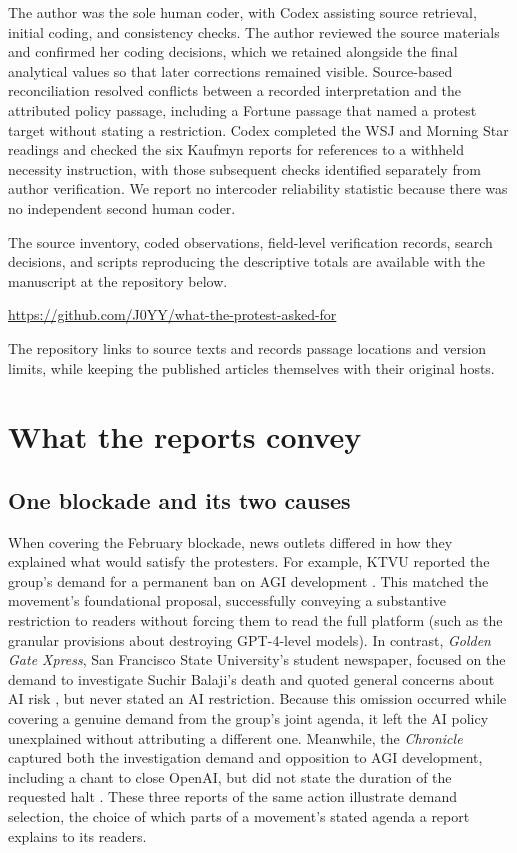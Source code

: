 \documentclass[11pt]{article}
\begin{document}
The author was the sole human coder, with Codex assisting source retrieval, initial coding, and consistency checks. The author reviewed the source materials and confirmed her coding decisions, which we retained alongside the final analytical values so that later corrections remained visible. Source-based reconciliation resolved conflicts between a recorded interpretation and the attributed policy passage, including a Fortune passage that named a protest target without stating a restriction. Codex completed the WSJ and Morning Star readings and checked the six Kaufmyn reports for references to a withheld necessity instruction, with those subsequent checks identified separately from author verification. We report no intercoder reliability statistic because there was no independent second human coder.

The source inventory, coded observations, field-level verification records, search decisions, and scripts reproducing the descriptive totals are available with the manuscript at the repository below.
\begin{center}
\url{https://github.com/J0YY/what-the-protest-asked-for}
\end{center}
\noindent The repository links to source texts and records passage locations and version limits, while keeping the published articles themselves with their original hosts.

\section{What the reports convey}
\subsection{One blockade and its two causes}
When covering the February blockade, news outlets differed in how they explained what would satisfy the protesters. For example, KTVU reported the group's demand for a permanent ban on AGI development \citep{ktvu,stopproposal}. This matched the movement's foundational proposal, successfully conveying a substantive restriction to readers without forcing them to read the full platform (such as the granular provisions about destroying GPT-4-level models). In contrast, \textit{Golden Gate Xpress}, San Francisco State University's student newspaper, focused on the demand to investigate Suchir Balaji's death and quoted general concerns about AI risk  \citep{singh,xpressabout}, but never stated an AI restriction. Because this omission occurred while covering a genuine demand from the group's joint agenda, it left the AI policy unexplained without attributing a different one. Meanwhile, the \textit{Chronicle} captured both the investigation demand and opposition to AGI development, including a chant to close OpenAI, but did not state the duration of the requested halt \citep{ho}. These three reports of the same action illustrate demand selection, the choice of which parts of a movement's stated agenda a report explains to its readers.
\end{document}

